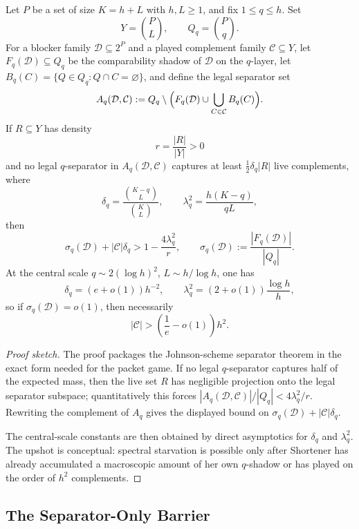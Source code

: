 \begin{theorem}\label{thm:q-shadow-dichotomy}
Let $P$ be a set of size $K=h+L$ with $h,L\ge 1$, and fix $1\le q\le h$.  Set
\[
Y=\binom{P}{L},
\qquad
Q_q=\binom{P}{q}.
\]
For a blocker family $\mathcal D\subseteq 2^P$ and a played complement family
$\mathcal C\subseteq Y$, let $F_q(\mathcal D)\subseteq Q_q$ be the
comparability shadow of $\mathcal D$ on the $q$-layer, let
$B_q(C)=\{Q\in Q_q:Q\cap C=\varnothing\}$, and define the legal separator set
\[
A_q(\mathcal D,\mathcal C)
:=
Q_q\setminus \Bigl(F_q(\mathcal D)\cup \bigcup_{C\in\mathcal C} B_q(C)\Bigr).
\]
If $R\subseteq Y$ has density
\[
r=\frac{|R|}{|Y|}>0
\]
and no legal $q$-separator in $A_q(\mathcal D,\mathcal C)$ captures at least
$\frac12\delta_q |R|$ live complements, where
\[
\delta_q=\frac{\binom{K-q}{L}}{\binom{K}{L}},
\qquad
\lambda_q^2=\frac{h(K-q)}{qL},
\]
then
\[
\sigma_q(\mathcal D)+|\mathcal C|\delta_q
>
1-\frac{4\lambda_q^2}{r},
\qquad
\sigma_q(\mathcal D):=\frac{|F_q(\mathcal D)|}{|Q_q|}.
\]
At the central scale $q\sim 2(\log h)^2$, $L\sim h/\log h$, one has
\[
\delta_q=(e+o(1))h^{-2},
\qquad
\lambda_q^2=(2+o(1))\frac{\log h}{h},
\]
so if $\sigma_q(\mathcal D)=o(1)$, then necessarily
\[
|\mathcal C|>\left(\frac{1}{e}-o(1)\right)h^2.
\]
\end{theorem}

\begin{proof}[Proof sketch]
The proof packages the Johnson-scheme separator theorem in the exact form
needed for the packet game.  If no legal $q$-separator captures half of the
expected mass, then the live set $R$ has negligible projection onto the legal
separator subspace; quantitatively this forces
$|A_q(\mathcal D,\mathcal C)|/|Q_q|<4\lambda_q^2/r$.  Rewriting the complement
of $A_q$ gives the displayed bound on
$\sigma_q(\mathcal D)+|\mathcal C|\delta_q$.

The central-scale constants are then obtained by direct asymptotics for
$\delta_q$ and $\lambda_q^2$.  The upshot is conceptual: spectral starvation is
possible only after Shortener has already accumulated a macroscopic amount of
her own $q$-shadow or has played on the order of $h^2$ complements.
\end{proof}

\subsection{The Separator-Only Barrier}

